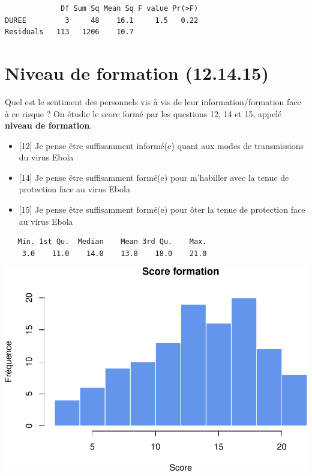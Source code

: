 \documentclass[]{article}
\begin{document}
\begin{verbatim}
             Df Sum Sq Mean Sq F value Pr(>F)
DUREE         3     48    16.1     1.5   0.22
Residuals   113   1206    10.7               
\end{verbatim}

\section{Niveau de formation
(12.14.15)}\label{niveau-de-formation-12.14.15}

Quel est le sentiment des personnels vis à vis de leur
information/formation face à ce risque ? On étudie le score formé par
les questions 12, 14 et 15, appelé \textbf{niveau de formation}.

\begin{itemize}
\item
  {[}12{]} Je pense être suffisamment informé(e) quant aux modes de
  transmissions du virus Ebola
\item
  {[}14{]} Je pense être suffisamment formé(e) pour m'habiller avec la
  tenue de protection face au virus Ebola
\item
  {[}15{]} Je pense être suffisamment formé(e) pour ôter la tenue de
  protection face au virus Ebola
\end{itemize}

\begin{verbatim}
   Min. 1st Qu.  Median    Mean 3rd Qu.    Max. 
    3.0    11.0    14.0    13.8    18.0    21.0 
\end{verbatim}

\includegraphics{analyse_files/figure-latex/unnamed-chunk-15-1.pdf}
\end{document}
